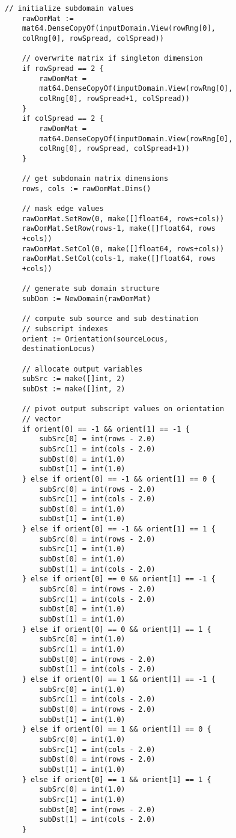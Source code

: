 \begin{lstlisting}[basicstyle=\small]
	// initialize subdomain values
	rawDomMat := 
	mat64.DenseCopyOf(inputDomain.View(rowRng[0], 
	colRng[0], rowSpread, colSpread))

	// overwrite matrix if singleton dimension
	if rowSpread == 2 {
		rawDomMat = 
		mat64.DenseCopyOf(inputDomain.View(rowRng[0], 
		colRng[0], rowSpread+1, colSpread))
	}
	if colSpread == 2 {
		rawDomMat = 
		mat64.DenseCopyOf(inputDomain.View(rowRng[0], 
		colRng[0], rowSpread, colSpread+1))
	}

	// get subdomain matrix dimensions
	rows, cols := rawDomMat.Dims()

	// mask edge values
	rawDomMat.SetRow(0, make([]float64, rows+cols))
	rawDomMat.SetRow(rows-1, make([]float64, rows
	+cols))
	rawDomMat.SetCol(0, make([]float64, rows+cols))
	rawDomMat.SetCol(cols-1, make([]float64, rows
	+cols))

	// generate sub domain structure
	subDom := NewDomain(rawDomMat)

	// compute sub source and sub destination 
	// subscript indexes
	orient := Orientation(sourceLocus, 
	destinationLocus)

	// allocate output variables
	subSrc := make([]int, 2)
	subDst := make([]int, 2)

	// pivot output subscript values on orientation 
	// vector
	if orient[0] == -1 && orient[1] == -1 {
		subSrc[0] = int(rows - 2.0)
		subSrc[1] = int(cols - 2.0)
		subDst[0] = int(1.0)
		subDst[1] = int(1.0)
	} else if orient[0] == -1 && orient[1] == 0 {
		subSrc[0] = int(rows - 2.0)
		subSrc[1] = int(cols - 2.0)
		subDst[0] = int(1.0)
		subDst[1] = int(1.0)
	} else if orient[0] == -1 && orient[1] == 1 {
		subSrc[0] = int(rows - 2.0)
		subSrc[1] = int(1.0)
		subDst[0] = int(1.0)
		subDst[1] = int(cols - 2.0)
	} else if orient[0] == 0 && orient[1] == -1 {
		subSrc[0] = int(rows - 2.0)
		subSrc[1] = int(cols - 2.0)
		subDst[0] = int(1.0)
		subDst[1] = int(1.0)
	} else if orient[0] == 0 && orient[1] == 1 {
		subSrc[0] = int(1.0)
		subSrc[1] = int(1.0)
		subDst[0] = int(rows - 2.0)
		subDst[1] = int(cols - 2.0)
	} else if orient[0] == 1 && orient[1] == -1 {
		subSrc[0] = int(1.0)
		subSrc[1] = int(cols - 2.0)
		subDst[0] = int(rows - 2.0)
		subDst[1] = int(1.0)
	} else if orient[0] == 1 && orient[1] == 0 {
		subSrc[0] = int(1.0)
		subSrc[1] = int(cols - 2.0)
		subDst[0] = int(rows - 2.0)
		subDst[1] = int(1.0)
	} else if orient[0] == 1 && orient[1] == 1 {
		subSrc[0] = int(1.0)
		subSrc[1] = int(1.0)
		subDst[0] = int(rows - 2.0)
		subDst[1] = int(cols - 2.0)
	}


\end{lstlisting}
